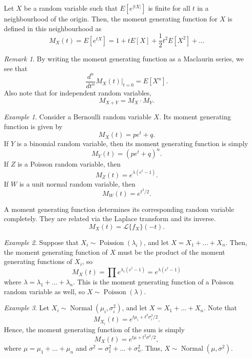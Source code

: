 \documentclass[11pt]{article}
\newcommand\dd[3][]{\frac{d^{#1}{#2}}{d {#3}^{#1}}}
\newcommand\E[1]{E\left[#1\right]}
\theoremstyle{definition}
\theoremstyle{remark}
\newtheorem*{remark}{Remark}
\newtheorem*{example}{Example}
\numberwithin{equation}{module}
\begin{document}
    \begin{definition}
        Let $X$ be a random variable such that $\E{e^{|tX|}}$ is finite for all $t$ 
        in a neighbourhood of the origin. Then, the moment generating function for
        $X$ is defined in this neighbourhood as \[
            M_X(t) = \E{e^{tX}} = 1 + t\E{X} + \frac{1}{2}t^2\E{X^2} + \dots
        \] 
        \begin{remark}
            By writing the moment generating function as a Maclaurin series, we see
            that \[
                \dd[n]{}{t}M_X(t)\Big|_{t = 0} = \E{X^n}.
            \] Also note that for independent random variables, \[
                M_{X + Y} = M_X \cdot M_Y.
            \] 
        \end{remark}
    \end{definition}
    \begin{example}
        Consider a Bernoulli random variable $X$. Its moment generating function is
        given by \[
            M_X(t) = pe^t + q.
        \] If $Y$ is a binomial random variable, then its moment generating function
        is simply \[
            M_Y(t) = (pe^t + q)^n.
        \] If $Z$ is a Poisson random variable, then \[
            M_Z(t) = e^{\lambda(e^t - 1)}.
        \] If $W$ is a unit normal random variable, then \[
            M_W(t) = e^{t^2 / 2}.
        \] 
    \end{example}

    \begin{theorem}
        A moment generating function determines its corresponding random variable
        completely. They are related via the Laplace transform and its inverse. \[
            M_X(t) = \mathcal{L}\{f_X\}(-t).
        \] 
    \end{theorem}
    \begin{example}
        Suppose that $X_i \sim \operatorname{Poission}(\lambda_i)$, and let $X = X_1
        + \dots + X_n$. Then, the moment generating function of $X$ must be the
        product of the moment generating functions of $X_i$, so \[
            M_X(t) = \prod e^{\lambda_i(e^t - 1)} = e^{\lambda(e^t - 1)}
        \] where $\lambda = \lambda_1 + \dots + \lambda_n$. This is the moment
        generating function of a Poisson random variable as well, so $X \sim
        \operatorname{Poisson}(\lambda)$.
    \end{example}
    \begin{example}
        Let $X_i \sim \operatorname{Normal}(\mu_i, \sigma_i^2)$, and let $X = X_1 +
        \dots + X_n$. Note that \[
            M_{X_i}(t) = e^{t\mu_i + t^2\sigma_i^2 / 2}.
        \] Hence, the moment generating function of the sum is simply \[
            M_X(t) = e^{t\mu + t^2\sigma^2 / 2},
        \] where $\mu = \mu_1 + \dots + \mu_n$ and $\sigma^2 = \sigma_1^2 + \dots +
        \sigma_n^2$. Thus, $X \sim \operatorname{Normal}(\mu, \sigma^2)$.
    \end{example}
\end{document}
